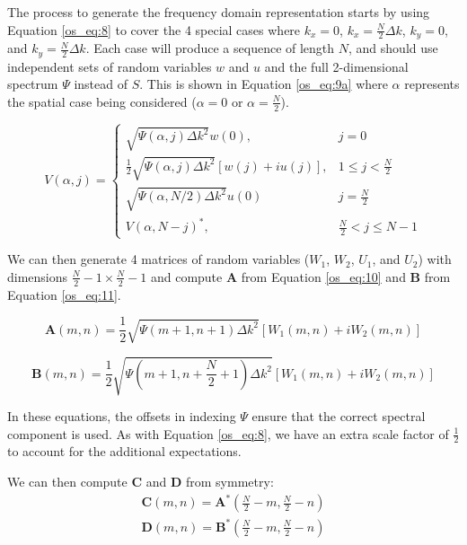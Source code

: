 The process to generate the frequency domain representation starts by using Equation \ref{os_eq:8} to cover the 4 special cases where $k_x = 0$, $k_x = \frac{N}{2}\Delta k$, $k_y = 0$, and $k_y = \frac{N}{2}\Delta k$. Each case will produce a sequence of length $N$, and should use independent sets of random variables $w$ and $u$ and the full 2-dimensional spectrum $\Psi$ instead of $S$. This is shown in Equation \ref{os_eq:9a} where $\alpha$ represents the spatial case being considered ($\alpha = 0$ or $\alpha = \frac{N}{2}$).

\begin{equation}
  \label{os_eq:9a}   
  V(\alpha,j) = \begin{cases}
    \sqrt{\Psi(\alpha,j)\Delta k^2}w(0), & j = 0 \\
    \frac{1}{2}\sqrt{\Psi(\alpha,j)\Delta k^2}\left[w(j) + iu(j) \right], & 1 \leq j < \frac{N}{2} \\
   \sqrt{\Psi(\alpha,N/2)\Delta k^2}u(0) & j = \frac{N}{2} \\
    V(\alpha,N-j)^*, &  \frac{N}{2} < j \leq N-1 
  \end{cases} 
\end{equation}

We can then generate 4 matrices of random variables ($W_1$, $W_2$, $U_1$, and $U_2$) with dimensions $\frac{N}{2} - 1 \times \frac{N}{2} - 1$ and compute $\mathbf{A}$ from Equation \ref{os_eq:10} and $\mathbf{B}$ from Equation \ref{os_eq:11}.

\begin{equation}
\label{os_eq:10}
\mathbf{A}(m,n) = \frac{1}{2}\sqrt{\Psi(m+1,n+1)\Delta k^2}\left[W_1(m,n) + iW_2(m,n) \right]
\end{equation}

\begin{equation}
\label{os_eq:11}
\mathbf{B}(m,n) = \frac{1}{2}\sqrt{\Psi(m+ 1,n+\frac{N}{2} +1)\Delta k^2}\left[W_1(m,n) + iW_2(m,n) \right]
\end{equation}

In these equations, the offsets in indexing $\Psi$ ensure that the correct spectral component is used. As with Equation \ref{os_eq:8}, we have an extra scale factor of $\frac{1}{2}$ to account for the additional expectations.

We can then compute $\mathbf{C}$ and $\mathbf{D}$ from symmetry:
\begin{equation}
\label{os_eq:12}
\begin{gathered}
\mathbf{C}(m,n) = \mathbf{A}^*\left(\frac{N}{2} - m, \frac{N}{2} - n \right) \\
\mathbf{D}(m,n) = \mathbf{B}^*\left(\frac{N}{2} - m, \frac{N}{2} - n \right) \\
\end{gathered}
\end{equation}

